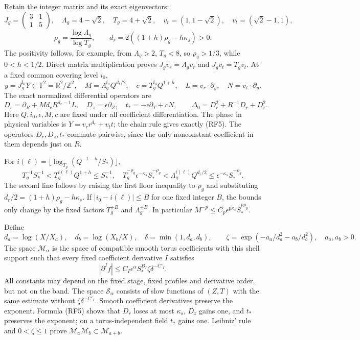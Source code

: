\documentclass[10pt,a4paper]{article}
\begin{document}
Retain the integer matrix and its exact eigenvectors:
\[
J_g=\begin{pmatrix}3&1\\1&5\end{pmatrix},\quad
\Lambda_g=4-\sqrt2,\quad T_g=4+\sqrt2,\quad
v_r=(1,1-\sqrt2),\quad v_t=(\sqrt2-1,1),
\]
\[
\rho_g=\frac{\log\Lambda_g}{\log T_g},\qquad
d_r=2((1+h)\rho_g-h\kappa_s)>0.
\]
The positivity follows, for example, from \(\Lambda_g>2\), \(T_g<8\),
so \(\rho_g>1/3\), while \(0<h<1/2\). Direct matrix
multiplication proves \(J_gv_r=\Lambda_gv_r\) and
\(J_gv_t=T_gv_t\). At a fixed common covering level \(i_0\),
\[
y=J_g^{i_0}Y\in\mathbb T^2=\mathbb R^2/\mathbb Z^2,
\quad M=\Lambda_g^{i_0}Q^{d_r/2},\quad c=T_g^{i_0}Q^{1+h},
\quad L=v_r\cdot\partial_y,\quad N=v_t\cdot\partial_y.
\]
The exact normalized differential operators are
\[
D_r=\partial_R+Md_rR^{d_r-1}L,\quad
D_z=\epsilon\partial_Z,\quad
t_*=-\epsilon\partial_T+cN,\qquad
\Delta_0=D_r^2+R^{-1}D_r+D_z^2.
\tag{RF5}
\]
Here \(Q,i_0,\epsilon,M,c\) are fixed under all coefficient
differentiation. The phase in physical variables is
\(Y=v_rr^{d_r}+v_tt\); the chain rule gives exactly (RF5).
The operators \(D_r,D_z,t_*\) commute pairwise, since the only
nonconstant coefficient in them depends just on \(R\).

For \(i(\ell)=\lfloor\log_{T_g}(Q^{-1-h}/S_*)\rfloor\),
\[
T_g^{-1}S_*^{-1}<T_g^{i(\ell)}Q^{1+h}\le S_*^{-1},
\quad
T_g^{-\rho_g}\epsilon^{-\kappa_s}S_*^{-\rho_g}
<\Lambda_g^{i(\ell)}Q^{d_r/2}
\le\epsilon^{-\kappa_s}S_*^{-\rho_g}.
\tag{RF6}
\]
The second line follows by raising the first floor inequality to
\(\rho_g\) and substituting \(d_r/2=(1+h)\rho_g-h\kappa_s\).
If \(|i_0-i(\ell)|\le B\) for one fixed integer \(B\), the bounds
only change by the fixed factors \(T_g^{\pm B}\) and
\(\Lambda_g^{\pm B}\). In particular
\(M^{-p}\le C_p\epsilon^{p\kappa_s}S_*^{p\rho_g}\).

Define
\[
d_a=\log(X/X_a),\quad d_b=\log(X_b/X),\quad
\delta=\min(1,d_a,d_b),\qquad
\zeta=\exp(-a_a/d_a^2-a_b/d_b^2),\quad a_a,a_b>0.
\]
The space \(\mathcal M_\alpha\) is the space of compatible smooth
torus coefficients with this shell support such that every fixed
coefficient derivative \(I\) satisfies
\[
|\partial^If|\le C_I\epsilon^\alpha S_*^{B_I}
\zeta\delta^{-C'_I}.
\tag{RF7}
\]
All constants may depend on the fixed stage, fixed profiles and derivative
order, but not on the band. The space \(\mathcal S_\alpha\) consists
of slow functions of \((Z,T)\) with the same estimate without
\(\zeta\delta^{-C'_I}\). Smooth coefficient derivatives preserve the
exponent. Formula (RF5) shows that \(D_r\) loses at most
\(\kappa_s\), \(D_z\) gains one, and \(t_*\) preserves the
exponent; on a torus-independent field \(t_*\) gains one.
Leibniz' rule and \(0<\zeta\le1\) prove
\(\mathcal M_a\mathcal M_b\subset\mathcal M_{a+b}\).
\end{document}
